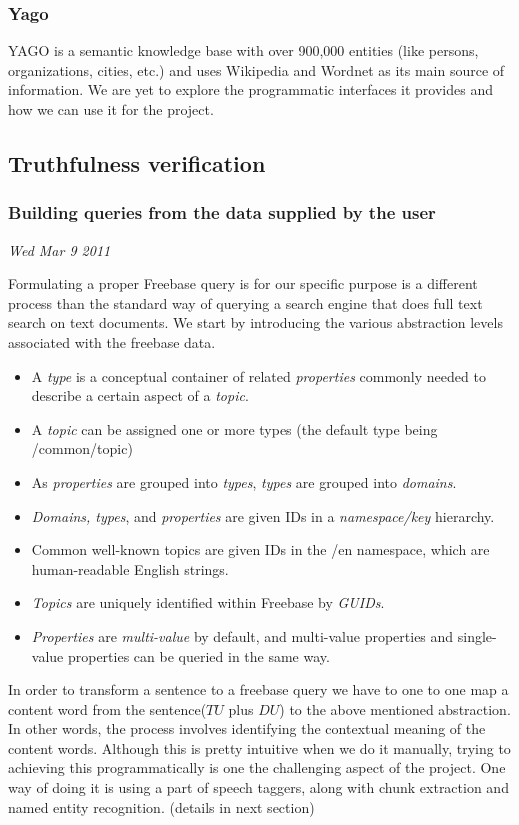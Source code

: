 \documentclass[11pt]{article}
\begin{document}
\subsubsection{Yago}
YAGO is a semantic knowledge base with over 900,000 entities (like persons,
organizations, cities, etc.) and uses Wikipedia and Wordnet as its main source of
information. We are yet to explore the programmatic interfaces it provides and
how we can use it for the project.




\subsection{Truthfulness verification }
\subsubsection {Building queries from the data supplied by the user}

{\em Wed Mar 9 2011}

Formulating a proper Freebase query is for our specific purpose is a different process than the standard way of querying a search engine that does full text search on text documents. We start by introducing the  various abstraction levels associated with the freebase data.
\begin{itemize}
    \item  A {\em type} is a conceptual container of related {\em properties} commonly needed to describe a certain aspect of a {\em topic}.
    \item  A {\em topic} can be assigned one or more types (the default type being /common/topic)
    \item  As {\em properties} are grouped into {\em types}, {\em types} are grouped into {\em domains}.
    \item  {\em Domains, types}, and {\em properties} are given IDs in a {\em namespace/key} hierarchy.
    \item  Common well-known topics are given IDs in the /en namespace, which are human-readable English strings.
    \item  {\em Topics} are uniquely identified within Freebase by {\em GUIDs}.
    \item  {\em Properties} are {\em multi-value} by default, and multi-value properties and single-value properties can be queried in the same way.
\end{itemize}
In order to transform a sentence to a freebase query we have to one to one map a content word from the sentence($TU$ plus $DU$) to the above mentioned abstraction. In other words, the process involves identifying the contextual meaning of the content words. Although this is pretty intuitive when we do it manually, trying to achieving this programmatically is one the challenging aspect of the project. One way of doing it is using a part of speech taggers, along with chunk extraction and named entity recognition. (details in next section) 
\end{document}
